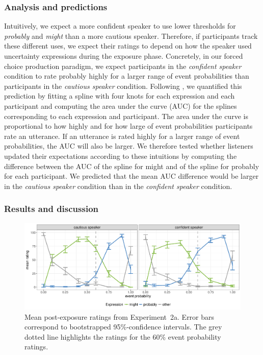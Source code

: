\documentclass[man, floatsintext]{apa6}
\begin{document}
\subsubsection{Analysis and predictions}  

Intuitively, we expect a more confident speaker to use lower thresholds for {\it probably} and {\it might} than a more cautious speaker.
Therefore, if participants track these different uses, we expect their ratings to depend on how the speaker used uncertainty expressions during the exposure phase. 
Concretely,  in our forced choice production paradigm, we expect participants in the \textit{confident speaker} condition to rate {\sc probably} highly for a larger range of event probabilities than participants
in the \textit{cautious speaker} condition. 
Following \cite{Yildirim2016}, we quantified this prediction by fitting a spline with four knots for each expression and each participant and computing the area 
under the curve (AUC) for the splines corresponding to each expression and participant. The area under the curve is proportional to how highly and for how large 
of event probabilities participants rate an utterance. If an utterance is rated highly for a larger range of event probabilities, the AUC will also be larger. 
We therefore tested whether listeners updated their expectations according to these intuitions by computing the difference between the AUC of the spline for 
{\sc might} and of the spline for {\sc probably} for each participant. We predicted that the mean AUC difference would be larger in the 
\emph{cautious speaker} condition than in the \emph{confident speaker} condition.

\subsubsection{Results and discussion}

\begin{figure}
\includegraphics[width=\textwidth]{plots/exp-1-ratings.pdf}
\caption{Mean post-exposure ratings from Experiment~2a. Error bars correspond to bootstrapped 95\%-confidence intervals.  The grey dotted line highlights the ratings for the 60\% event probability ratings.  \label{fig:adaptation-results-prod-orig}}
\end{figure}
\end{document}
